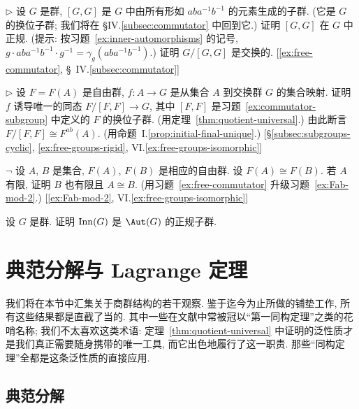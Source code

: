 \begin{prob}
\label{ex:commutator-subgroup}
$\triangleright$ 设 $G$ 是群, $[G, G]$ 是 $G$ 中由所有形如 $aba^{-1}b^{-1}$ 的元素生成的子群. (它是 $G$ 的换位子群; 我们将在 \S IV.\ref{subsec:commutator} 中回到它.) 证明 $[G, G]$ 在 $G$ 中正规. (提示: 按习题~\ref{ex:inner-automorphisms} 的记号, $g \cdot aba^{-1}b^{-1} \cdot g^{-1} = \gamma_g(aba^{-1}b^{-1})$.) 证明 $G/[G, G]$ 是交换的. [\ref{ex:free-commutator}, \S~IV.\ref{subsec:commutator}]
\end{prob}

\begin{prob}
\label{ex:free-commutator}
$\triangleright$ 设 $F = F(A)$ 是自由群, $f : A \to G$ 是从集合 $A$ 到交换群 $G$ 的集合映射. 证明 $f$ 诱导唯一的同态 $F/[F, F] \to G$, 其中 $[F, F]$ 是习题~\ref{ex:commutator-subgroup} 中定义的 $F$ 的换位子群. (用定理~\ref{thm:quotient-universal}.) 由此断言 $F/[F, F] \cong F^{ab}(A)$. (用命题~I.\ref{prop:initial-final-unique}.) [\S\ref{subsec:subgroups-cyclic}, \ref{ex:free-groups-rigid}, VI.\ref{ex:free-groups-isomorphic}]
\end{prob}

\begin{prob}
\label{ex:free-groups-rigid}
$\neg$ 设 $A$, $B$ 是集合, $F(A)$, $F(B)$ 是相应的自由群. 设 $F(A) \cong F(B)$. 若 $A$ 有限, 证明 $B$ 也有限且 $A \cong B$. (用习题~\ref{ex:free-commutator} 升级习题~\ref{ex:Fab-mod-2}.) [\ref{ex:Fab-mod-2}, VI.\ref{ex:free-groups-isomorphic}]
\end{prob}

\begin{prob}
\label{ex:inner-automorphisms-normal}
设 $G$ 是群. 证明 $\operatorname{Inn}(G)$ 是 $\Aut(G)$ 的正规子群.
\end{prob}

\section{典范分解与 Lagrange 定理}
\label{subsec:lagrange}

我们将在本节中汇集关于商群结构的若干观察. 鉴于迄今为止所做的铺垫工作, 所有这些结果都是直截了当的. 其中一些在文献中常被冠以``第一同构定理''之类的花哨名称; 我们不太喜欢这类术语: 定理~\ref{thm:quotient-universal} 中证明的泛性质才是我们真正需要随身携带的唯一工具, 而它出色地履行了这一职责. 那些``同构定理''全都是这条泛性质的直接应用.

\subsection{典范分解}
\label{subsec:canon-quotient}

